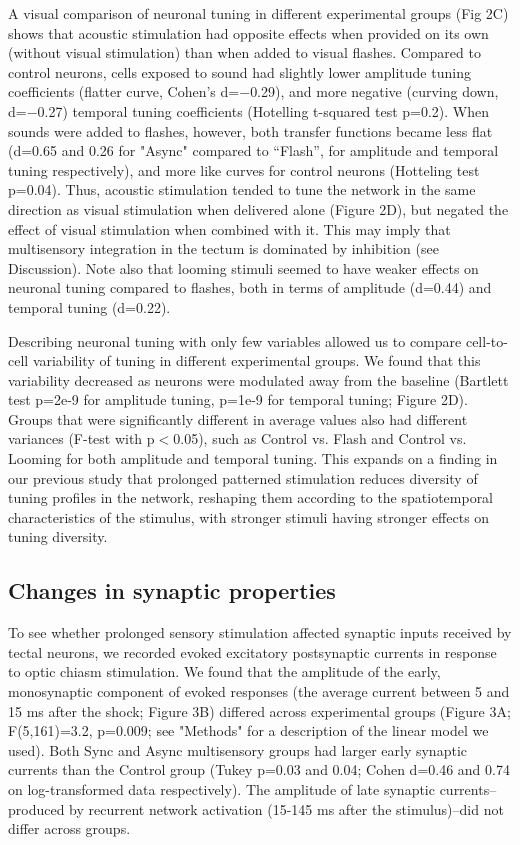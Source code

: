 \documentclass{article}
\begin{document}
A visual comparison of neuronal tuning in different experimental groups (Fig 2C) shows that acoustic stimulation had opposite effects when provided on its own (without visual stimulation) than when added to visual flashes. Compared to control neurons, cells exposed to sound had slightly lower amplitude tuning coefficients (flatter curve, Cohen’s d=$-$0.29), and more negative (curving down, d=$-$0.27) temporal tuning coefficients (Hotelling t-squared test p=0.2). When sounds were added to flashes, however, both transfer functions became less flat (d=0.65 and 0.26 for "Async" compared to “Flash”, for amplitude and temporal tuning respectively), and more like curves for control neurons (Hotteling test p=0.04). Thus, acoustic stimulation tended to tune the network in the same direction as visual stimulation when delivered alone (Figure 2D), but negated the effect of visual stimulation when combined with it. This may imply that multisensory integration in the tectum is dominated by inhibition (see Discussion). Note also that looming stimuli seemed to have weaker effects on neuronal tuning compared to flashes, both in terms of amplitude (d=0.44) and temporal tuning (d=0.22).

Describing neuronal tuning with only few variables allowed us to compare cell-to-cell variability of tuning in different experimental groups. We found that this variability decreased as neurons were modulated away from the baseline (Bartlett test p=2e-9 for amplitude tuning, p=1e-9 for temporal tuning; Figure 2D). Groups that were significantly different in average values also had different variances (F-test with p$<$0.05), such as Control vs. Flash and Control vs. Looming for both amplitude and temporal tuning. This expands on a finding in our previous study \citep{ciarleglio2015} that prolonged patterned stimulation reduces diversity of tuning profiles in the network, reshaping them according to the spatiotemporal characteristics of the stimulus, with stronger stimuli having stronger effects on tuning diversity.

\subsection*{Changes in synaptic properties}

To see whether prolonged sensory stimulation affected synaptic inputs received by tectal neurons, we recorded evoked excitatory postsynaptic currents in response to optic chiasm stimulation. We found that the amplitude of the early, monosynaptic component of evoked responses (the average current between 5 and 15 ms after the shock; Figure 3B) differed across experimental groups (Figure 3A; F(5,161)=3.2, p=0.009; see "Methods" for a description of the linear model we used). Both Sync and Async multisensory groups had larger early synaptic currents than the Control group (Tukey p=0.03 and 0.04; Cohen d=0.46 and 0.74 on log-transformed data respectively). The amplitude of late synaptic currents–produced by recurrent network activation (15-145 ms after the stimulus)–did not differ across groups.
\end{document}
